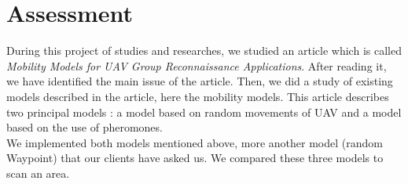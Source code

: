 \part{Assessment}

During this project of studies and researches, we studied an article which is called \textit{Mobility Models for UAV Group Reconnaissance Applications}. After reading it, we have identified the main issue of the article. Then, we did a study of existing models described in the article, here the mobility models. This article describes two principal models : a model based on random movements of UAV and a model based on the use of pheromones.\\
We implemented both models mentioned above, more another model (random Waypoint) that our clients have asked us. We compared these three models to scan an area. 
